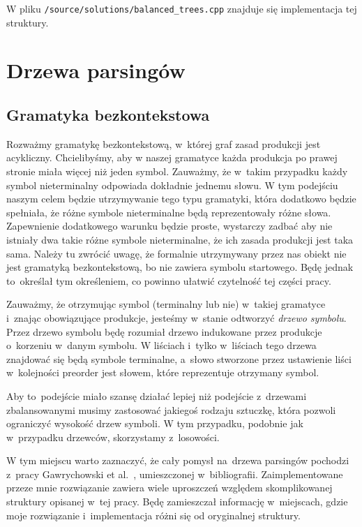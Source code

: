 \documentclass[declaration,shortabstract]{iithesis}
\theoremstyle{definition} \newtheorem{definition}{Definicja}[chapter]
\theoremstyle{plain} \newtheorem{remark}[definition]{Obserwacja}
\theoremstyle{plain} \newtheorem{theorem}[definition]{Twierdzenie}
\theoremstyle{plain} \newtheorem{example}{Przykład}[definition]
\theoremstyle{plain} \newtheorem{lemma}[definition]{Lemat}
\begin{document}
W pliku \texttt{/source/solutions/balanced\_trees.cpp} znajduje się implementacja tej struktury.

\section{Drzewa parsingów}

\subsection{Gramatyka bezkontekstowa}

Rozważmy gramatykę bezkontekstową, w~której graf zasad produkcji jest acykliczny. Chcielibyśmy, aby w naszej gramatyce każda produkcja po prawej stronie miała więcej niż jeden symbol. Zauważmy, że w~takim przypadku każdy symbol nieterminalny odpowiada dokładnie jednemu słowu. W tym podejściu naszym celem będzie utrzymywanie tego typu gramatyki, która dodatkowo będzie spełniała, że różne symbole nieterminalne będą reprezentowały różne słowa. Zapewnienie dodatkowego warunku będzie proste, wystarczy zadbać aby nie istniały dwa takie różne symbole nieterminalne, że ich zasada produkcji jest taka sama. Należy tu zwrócić uwagę, że formalnie utrzymywany przez nas obiekt nie jest gramatyką bezkontekstową, bo nie zawiera symbolu startowego. Będę jednak to~określał tym określeniem, co powinno ułatwić czytelność tej części pracy.

Zauważmy, że otrzymując symbol (terminalny lub nie) w~takiej gramatyce i~znając obowiązujące produkcje, jesteśmy w~stanie odtworzyć \textit{drzewo symbolu}. Przez drzewo symbolu będę rozumiał drzewo indukowane przez produkcje o~korzeniu w~danym symbolu. W liściach i~tylko w~liściach tego drzewa znajdować się będą symbole terminalne, a~słowo stworzone przez ustawienie liści w~kolejności preorder jest słowem, które reprezentuje otrzymany symbol.

Aby to~podejście miało szansę działać lepiej niż podejście z~drzewami zbalansowanymi musimy zastosować jakiegoś rodzaju sztuczkę, która pozwoli ograniczyć wysokość drzew symboli. W tym przypadku, podobnie jak w~przypadku drzewców, skorzystamy z~losowości.

W tym miejscu warto zaznaczyć, że cały pomysł na~drzewa parsingów pochodzi z~pracy Gawrychowski et al.~\cite{gawrychowski}, umieszczonej w~bibliografii. Zaimplementowane przeze mnie rozwiązanie zawiera wiele uproszczeń względem skomplikowanej struktury opisanej w~tej pracy. Będę zamieszczał informację w~miejscach, gdzie moje rozwiązanie i~implementacja różni się od oryginalnej struktury.
\end{document}
